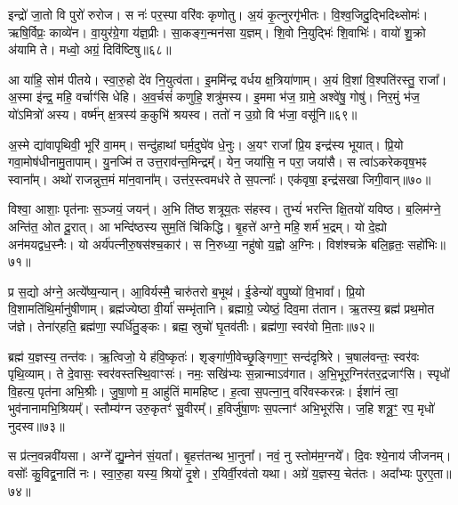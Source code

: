 इन्द्रो॑ जा॒तो वि पुरो॑ रुरोज।
स नः॑ पर॒स्पा वरि॑वः कृणोतु।
अ॒यं कृ॒त्नुरगृ॑भीतः।
वि॒श्व॒जिदु॒द्भिदिथ्सोमः॑।
ऋषि॒र्विप्रः॒ काव्ये॑न।
वा॒युर॑ग्रे॒गा य॑ज्ञ॒प्रीः।
सा॒कङ्ग॒न्मन॑सा य॒ज्ञम्।
शि॒वो नि॒युद्भिः॑ शि॒वाभिः॑।
वायो॑ शु॒क्रो अ॑यामि ते।
मध्वो॒ अग्रं॒ दिवि॑ष्टिषु॥६८॥\ip

आ या॑हि॒ सोम॑ पीतये।
स्वा॒रु॒हो दे॑व नि॒युत्व॑ता।
इ॒ममि॑न्द्र वर्धय क्ष॒त्रिया॑णाम्।
अ॒यं वि॒शां वि॒श्पति॑रस्तु॒ राजा᳚।
अ॒स्मा इ॑न्द्र॒ महि॒ वर्चाꣳ॑सि धेहि।
अ॒व॒र्चसं॑ कणुहि॒ शत्रु॑मस्य।
इ॒ममा भ॑ज॒ ग्रामे॒ अश्वे॑षु॒ गोषु॑।
निर॒मुं भ॑ज॒ यो॑\-ऽमित्रो॑ अस्य।
वर्ष्म॑न् क्ष॒त्रस्य॑ क॒कुभि॑ श्रयस्व।
ततो॑ न उ॒ग्रो वि भ॑जा॒ वसू॑नि॥६९॥\ip

अ॒स्मे द्या॑वापृथिवी॒ भूरि॑ वा॒मम्।
सन्दु॑हाथां घर्म॒दुघे॑व धे॒नुः।
अ॒यꣳ राजा᳚ प्रि॒य इन्द्र॑स्य भूयात्।
प्रि॒यो गवा॒मोष॑धीनामु॒तापाम्।
यु॒नज्मि॑ त उत्त॒राव॑न्त॒मिन्द्रम्᳚।
येन॒ जया॑सि॒ न परा॒ जया॑सै।
स त्वा॑\-ऽकरेकवृष॒भꣴ स्वाना᳚म्।
अथो॑ राजन्नुत्त॒मं मा॑न॒वाना᳚म्।
उत्त॑र॒स्त्वमध॑रे ते स॒पत्नाः᳚।
एक॑वृषा॒ इन्द्र॑सखा जिगी॒वान्॥७०॥\ip

विश्वा॒ आशाः॒ पृत॑नाः स॒ञ्जयं॒ जयन्॑।
अ॒भि ति॑ष्ठ शत्रूय॒तः स॑हस्व।
तुभ्यं॑ भरन्ति क्षि॒तयो॑ यविष्ठ।
ब॒लिम॑ग्ने॒ अन्ति॑त॒ ओत दू॒रात्।
आ भन्दि॑ष्ठस्य सुम॒तिं चि॑किद्धि।
बृ॒हत्ते॑ अग्ने॒ महि॒ शर्म॑ भ॒द्रम्।
यो दे॒ह्यो अन॑मयद्वध॒स्नैः।
यो अर्य॑पत्नीरु॒षस॑श्च॒कार॑।
स नि॒रुध्या॒ नहु॑षो य॒ह्वो अ॒ग्निः।
विश॑श्चक्रे बलि॒हृतः॒ सहो॑भिः॥७१॥\ip

प्र स॒द्यो अ॑ग्ने॒ अत्ये᳚ष्य॒न्यान्।
आ॒विर्यस्मै॒ चारु॑तरो ब॒भूथ॑।
ई॒डेन्यो॑ वपु॒ष्यो॑ वि॒भावा᳚।
प्रि॒यो वि॒शामति॑थि॒र्मानु॑षीणाम्।
ब्रह्म॑ज्येष्ठा वी॒र्या॑ सम्भृ॑तानि।
ब्रह्माग्रे॒ ज्येष्ठं॒ दिव॒मा त॑तान।
ऋ॒तस्य॒ ब्रह्म॑ प्रथ॒मोत ज॑ज्ञे।
तेना॑र्‌\mbox{}हति॒ ब्रह्म॑णा॒ स्पर्धि॑तु॒ङ्कः।
ब्रह्म॒ स्रुचो॑ घृ॒तव॑तीः।
ब्रह्म॑णा॒ स्वर॑वो मि॒ताः॥७२॥\ip

ब्रह्म॑ य॒ज्ञस्य॒ तन्त॑वः।
ऋ॒त्विजो॒ ये ह॑वि॒ष्कृतः॑।
शृङ्गा॑णी॒वेच्छृ॒ङ्गिणा॒ꣳ॒ सन्द॑दृश्रिरे।
च॒षाल॑वन्तः॒ स्वर॑वः पृथि॒व्याम्।
ते दे॒वासः॒ स्वर॑वस्तस्थि॒वाꣳसः॑।
नमः॒ सखि॑भ्यः स॒न्नान्मा\-ऽव॑गात।
अ॒भि॒भूर॒ग्निर॑तर॒द्रजाꣳ॑सि।
स्पृधो॑ वि॒हत्य॒ पृत॑ना अभि॒श्रीः।
जु॒षा॒णो म॒ आहु॑तिं मामहिष्ट।
ह॒त्वा स॒पत्ना॒न्॒ वरि॑वस्करन्नः।
ईशा॑नं त्वा॒ भुव॑नानामभि॒श्रियम्᳚।
स्तौम्य॑ग्न उरु॒कृतꣳ॑ सु॒वीरम्᳚।
ह॒विर्जु॑षा॒णः स॒पत्नाꣳ॑ अभि॒भूर॑सि।
ज॒हि शत्रू॒ꣳ॒ रप॒ मृधो॑ नुदस्व॥७३॥\ip\anuvakamend[वि॒शां ज॑यामसि जीरदानो॒ हर्या॒ विश्वा॒ दिवि॑ष्टिषु॒ वसू॑नि जिगी॒वान्थ्सहो॑भिर्मि॒ता न॑श्च॒त्वारि॑ च]

स प्र॑त्न॒वन्नवी॑यसा।
अग्ने᳚ द्यु॒म्नेन॑ सं॒यता᳚।
बृ॒हत्त॑तन्थ भा॒नुना᳚।
नवं॒ नु स्तोम॑म॒ग्नये᳚।
दि॒वः श्ये॒नाय॑ जीजनम्।
वसोः᳚ कु॒विद्व॒नाति॑ नः।
स्वा॒रु॒हा यस्य॒ श्रियो॑ दृ॒शे।
र॒यिर्वी॒रव॑तो यथा।
अग्रे॑ य॒ज्ञस्य॒ चेत॑तः।
अदा᳚भ्यः पुरए॒ता॥७४॥\ip

